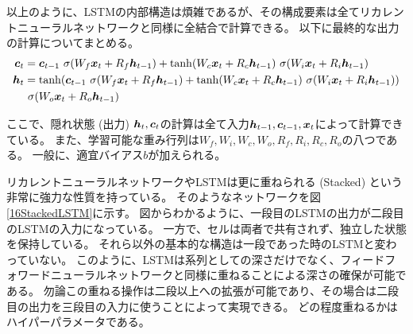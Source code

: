 以上のように、LSTMの内部構造は煩雑であるが、その構成要素は全てリカレントニューラルネットワークと同様に全結合で計算できる。
以下に最終的な出力の計算についてまとめる。
\begin{equation}
 \begin{split}
  {\mbox{\boldmath{$c$}}}_{t} 
  &= {\mbox{\boldmath{$c$}}}_{t-1} \  \sigma (W_f {\mbox{\boldmath{$x$}}}_t + R_f {\mbox{\boldmath{$h$}}}_{t-1}) 
  + \tanh (W_c {\mbox{\boldmath{$x$}}}_t + R_c {\mbox{\boldmath{$h$}}}_{t-1}) \  \sigma (W_i {\mbox{\boldmath{$x$}}}_t + R_i {\mbox{\boldmath{$h$}}}_{t-1})\\
  {\mbox{\boldmath{$h$}}}_{t} 
  &= \tanh({\mbox{\boldmath{$c$}}}_{t-1} \  \sigma (W_f {\mbox{\boldmath{$x$}}}_t + R_f {\mbox{\boldmath{$h$}}}_{t-1}) 
  + \tanh (W_c {\mbox{\boldmath{$x$}}}_t + R_c {\mbox{\boldmath{$h$}}}_{t-1}) \  \sigma (W_i {\mbox{\boldmath{$x$}}}_t + R_i {\mbox{\boldmath{$h$}}}_{t-1})) \\
  &\  \sigma (W_o {\mbox{\boldmath{$x$}}}_t + R_o {\mbox{\boldmath{$h$}}}_{t-1})
 \end{split}
\end{equation}

ここで、隠れ状態 (出力) ${\mbox{\boldmath{$h$}}}_t,{\mbox{\boldmath{$c$}}}_t$の計算は全て入力${\mbox{\boldmath{$h$}}}_{t-1},{\mbox{\boldmath{$c$}}}_{t-1},{\mbox{\boldmath{$x$}}}_t$によって計算できている。
また、学習可能な重み行列は$W_f, W_i, W_c, W_o, R_f, R_i, R_c, R_o$の八つである。
一般に、適宜バイアス$b$が加えられる。

リカレントニューラルネットワークやLSTMは更に重ねられる (Stacked) という非常に強力な性質を持っている。
そのようなネットワークを図\ref{16StackedLSTM}に示す。
図からわかるように、一段目のLSTMの出力が二段目のLSTMの入力になっている。
一方で、セルは両者で共有されず、独立した状態を保持している。
それら以外の基本的な構造は一段であった時のLSTMと変わっていない。
このように、LSTMは系列としての深さだけでなく、フィードフォワードニューラルネットワークと同様に重ねることによる深さの確保が可能である。
勿論この重ねる操作は二段以上への拡張が可能であり、その場合は二段目の出力を三段目の入力に使うことによって実現できる。
どの程度重ねるかはハイパーパラメータである。

